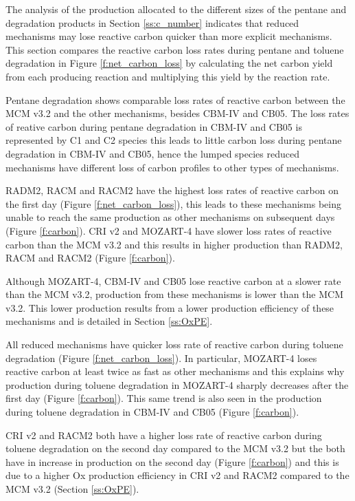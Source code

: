 The analysis of the  production allocated to the different sizes of the pentane and degradation products in Section \ref{ss:c_number} indicates that reduced mechanisms may lose reactive carbon quicker than more explicit mechanisms.
This section compares the reactive carbon loss rates during pentane and toluene degradation in Figure \ref{f:net_carbon_loss} by calculating the net carbon yield from each  producing reaction and multiplying this yield by the reaction rate.

Pentane degradation shows comparable loss rates of reactive carbon between the MCM v3.2 and the other mechanisms, besides CBM-IV and CB05.
The loss rates of reative carbon during pentane degradation in CBM-IV and CB05 is represented by C1 and C2 species this leads to little carbon loss during pentane degradation in CBM-IV and CB05, hence the lumped species reduced mechanisms have different loss of carbon profiles to other types of mechanisms.

RADM2, RACM and RACM2 have the highest loss rates of reactive carbon on the first day (Figure \ref{f:net_carbon_loss}), this leads to these mechanisms being unable to reach the same  production as other mechanisms on subsequent days (Figure \ref{f:carbon}).
CRI v2 and MOZART-4 have slower loss rates of reactive carbon than the MCM v3.2 and this results in higher  production than RADM2, RACM and RACM2 (Figure \ref{f:carbon}).

Although MOZART-4, CBM-IV and CB05 lose reactive carbon at a slower rate than the MCM v3.2,  production from these mechanisms is lower than the MCM v3.2.
This lower  production results from a lower  production efficiency of these mechanisms and is detailed in Section \ref{ss:OxPE}.

All reduced mechanisms have quicker loss rate of reactive carbon during toluene degradation (Figure \ref{f:net_carbon_loss}).
In particular, MOZART-4 loses reactive carbon at least twice as fast as other mechanisms and this explains why  production during toluene degradation in MOZART-4 sharply decreases after the first day (Figure \ref{f:carbon}).
This same trend is also seen in the  production during toluene degradation in CBM-IV and CB05 (Figure \ref{f:carbon}).

CRI v2 and RACM2 both have a higher loss rate of reactive carbon during toluene degradation on the second day compared to the MCM v3.2 but the both have in increase in  production on the second day (Figure \ref{f:carbon}) and this is due to a higher Ox production efficiency in CRI v2 and RACM2 compared to the MCM v3.2 (Section \ref{ss:OxPE}).

